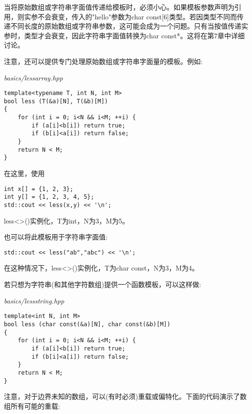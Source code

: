 当将原始数组或字符串字面值传递给模板时，必须小心。如果模板参数声明为引用，则实参不会衰变，传入的"hello"参数为char const[6]类型。若因类型不同而传递不同长度的原始数组或字符串参数，这可能会成为一个问题。只有当按值传递实参时，类型才会衰变，因此字符串字面值转换为char const*。这将在第7章中详细讨论。

注意，还可以提供专门处理原始数组或字符串字面量的模板。例如:

\noindent
\textit{basics/lessarray.hpp}
\begin{lstlisting}[style=styleCXX]
template<typename T, int N, int M>
bool less (T(&a)[N], T(&b)[M])
{
	for (int i = 0; i<N && i<M; ++i) {
		if (a[i]<b[i]) return true;
		if (b[i]<a[i]) return false;
	}
	return N < M;
}
\end{lstlisting}

在这里，使用

\begin{lstlisting}[style=styleCXX]
int x[] = {1, 2, 3};
int y[] = {1, 2, 3, 4, 5};
std::cout << less(x,y) << '\n';
\end{lstlisting}

less<>()实例化，T为int，N为3，M为5。

也可以将此模板用于字符串字面值:

\begin{lstlisting}[style=styleCXX]
std::cout << less("ab","abc") << '\n';
\end{lstlisting}

在这种情况下，less<>()实例化，T为char const，N为3，M为4。

若只想为字符串(和其他字符数组)提供一个函数模板，可以这样做:

\noindent
\textit{basics/lessstring.hpp}
\begin{lstlisting}[style=styleCXX]
template<int N, int M>
bool less (char const(&a)[N], char const(&b)[M])
{
	for (int i = 0; i<N && i<M; ++i) {
		if (a[i]<b[i]) return true;
		if (b[i]<a[i]) return false;
	}
	return N < M;
}
\end{lstlisting}

注意，对于边界未知的数组，可以(有时必须)重载或偏特化。下面的代码演示了数组所有可能的重载:

